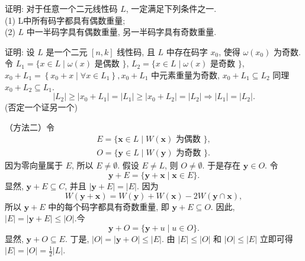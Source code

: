 \begin{exercise}
证明: 对于任意一个二元线性码 $ L $, 一定满足下列条件之一.\\
(1) L中所有码字都具有偶数重量;\\
(2) $ L $ 中一半码字具有偶数重量, 另一半码字具有奇数重量.
\end{exercise}
\begin{solution}
    证明: 设 $ L $ 是一个二元 $ [n, k] $ 线性码, 且 $ L $ 中存在码字 $ x_{0} $, 使得 $ \omega\left(x_{0}\right) $ 为奇数.
令 $ L_{1}=\{x \in L \mid \omega(x) $ 是偶数 $ \} $,
$ L_{2}=\{x \in L \mid \omega(x) $ 是奇数 $ \} $,
$ x_{0}+L_{1}=\left\{x_{0}+x \mid \forall x \in L_{1}\right\} , x_{0}+L_{1} $ 中元素重量为奇数, $ x_{0}+L_{1} \subseteq L_{2} $
同理 $ x_{0}+L_{2} \subseteq L_{1} $.
$$
\left|L_{2}\right| \geq\left|x_{0}+L_{1}\right|=\left|L_{1}\right| \geq\left|x_{0}+L_{2}\right|=\left|L_{2}\right| \Rightarrow\left|L_{1}\right|=\left|L_{2}\right| .
$$
(否定一个证另一个)

（方法二）令
$$
\begin{array}{l}
E=\{\boldsymbol{x} \in L \mid W(\boldsymbol{x}) \text { 为偶数 }\}, \\
O=\{\boldsymbol{y} \in L \mid W(\boldsymbol{y}) \text { 为奇数 }\} .
\end{array}
$$
因为零向量属于 $ E $, 所以 $ E \neq \emptyset $. 假设 $ E \neq L $, 则 $ O \neq \emptyset $. 于是存在 $ \boldsymbol{y} \in O $. 令
$$
\boldsymbol{y}+E=\{\boldsymbol{y}+\boldsymbol{x} \mid \boldsymbol{x} \in E\} .
$$
显然, $ \boldsymbol{y}+E \subseteq C $, 并且 $ |\boldsymbol{y}+E|=|E| $. 因为
$$
W(\boldsymbol{y}+\boldsymbol{x})=W(\boldsymbol{y})+W(\boldsymbol{x})-2 W(\boldsymbol{y} \cap \boldsymbol{x}),
$$
所以 $ \boldsymbol{y}+E $ 中的每个码字都具有奇数重量, 即 $ \boldsymbol{y}+E \subseteq O $. 因此, $ |E|=|\boldsymbol{y}+E| \leq|O| $.今
$$
\boldsymbol{y}+O=\{\boldsymbol{y}+u \mid u \in O\} .
$$
显然, $ \boldsymbol{y}+O \subseteq E $. 丁是, $ |O|=|\boldsymbol{y}+O| \leq|E| $. 由 $ |E| \leq|O| $ 和 $ |O| \leq|E| $ 立即可得 $ |E|=|O|=\frac{1}{2}|L| $.

\end{solution}



